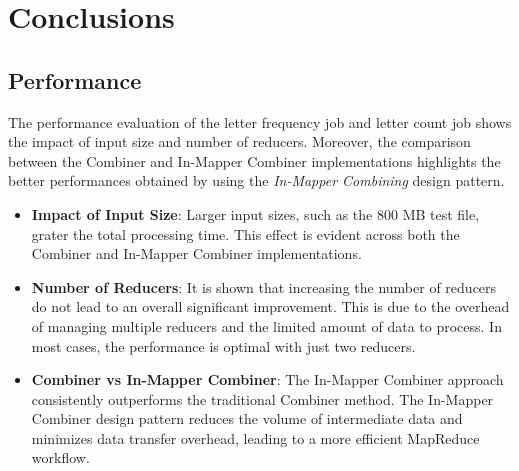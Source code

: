 \newpage
\section{Conclusions}

\subsection{Performance}

The performance evaluation of the letter frequency job and letter count job shows the impact of input size and number of reducers. Moreover, the comparison between the Combiner and In-Mapper Combiner implementations highlights the better performances obtained by using the \textit{In-Mapper Combining} design pattern.

\begin{itemize}
\item \textbf{Impact of Input Size}: Larger input sizes, such as the 800 MB test file, grater the total processing time. This effect is evident across both the Combiner and In-Mapper Combiner implementations.
\item \textbf{Number of Reducers}: It is shown that increasing the number of reducers do not lead to an overall significant improvement. This is due to the overhead of managing multiple reducers and the limited amount of data to process. In most cases, the performance is optimal with just two reducers.

\item \textbf{Combiner vs In-Mapper Combiner}: The In-Mapper Combiner approach consistently outperforms the traditional Combiner method. The In-Mapper Combiner design pattern reduces the volume of intermediate data and minimizes data transfer overhead, leading to a more efficient MapReduce workflow.

\end{itemize}


